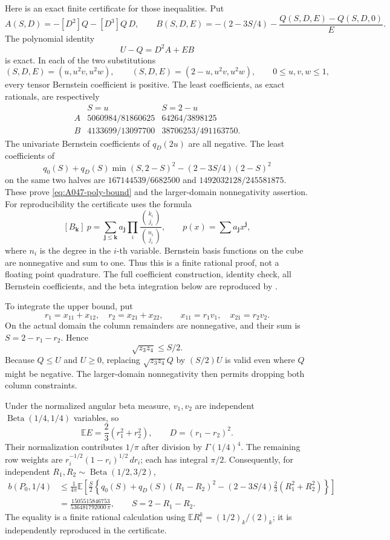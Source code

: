 Here is an exact finite certificate for those inequalities.
Put
\[
 A(S,D)=-[D^2]Q-[D^3]Q\,D,\qquad
 B(S,D,E)=-(2-3S/4)-\frac{Q(S,D,E)-Q(S,D,0)}E .
\]
The polynomial identity
\[
                      U-Q=D^2A+EB
\]
is exact.  In each of the two substitutions
\[
 (S,D,E)=(u,u^2v,u^2w),\qquad
 (S,D,E)=(2-u,u^2v,u^2w),
                   \qquad 0\le u,v,w\le1,
\]
every tensor Bernstein coefficient is positive.  The
least coefficients, as exact rationals, are respectively
\[
 \begin{array}{c|cc}
    & S=u & S=2-u\\ \hline
 A &5060984/81860625&64264/3898125\\
 B &4133699/13097700&38706253/491163750 .
 \end{array}
\]
The univariate Bernstein coefficients of \(q_D(2u)\)
are all negative.  The least coefficients of
\[
 q_0(S)+q_D(S)\min(S,2-S)^2
                              -(2-3S/4)(2-S)^2
\]
on the same two halves are
\(167144539/6682500\) and \(1492032128/245581875\).
These prove \eqref{eq:A047-poly-bound} and the larger-domain
nonnegativity assertion.  For reproducibility the certificate
uses the formula
\[
 [B_{\mathbf k}]\ p
   =\sum_{\mathbf j\le\mathbf k}a_{\mathbf j}
           \prod_i\frac{\binom{k_i}{j_i}}{\binom{n_i}{j_i}},
 \qquad p(x)=\sum a_{\mathbf j}x^{\mathbf j},
\]
where \(n_i\) is the degree in the \(i\)-th variable.
Bernstein basis functions on the cube are nonnegative and
sum to one.  Thus this is a finite rational proof, not a
floating point quadrature.  The full coefficient construction,
identity check, all Bernstein coefficients, and the beta
integration below are reproduced by
.

To integrate the upper bound, put
\[
 r_1=x_{11}+x_{12},\quad r_2=x_{21}+x_{22},\qquad
 x_{11}=r_1v_1,\quad x_{21}=r_2v_2 .
\]
On the actual domain the column remainders are nonnegative,
and their sum is \(S=2-r_1-r_2\).  Hence
\[
 \sqrt{z_3z_4}\le S/2.
\]
Because \(Q\le U\) and \(U\ge0\), replacing
\(\sqrt{z_3z_4}Q\) by \((S/2)U\) is valid even
where \(Q\) might be negative.  The larger-domain
nonnegativity then permits dropping both column constraints.

Under the normalized angular beta measure,
\(v_1,v_2\) are independent
\(\operatorname{Beta}(1/4,1/4)\) variables, so
\[
 \mathbb E E=\frac23(r_1^2+r_2^2),\qquad
 D=(r_1-r_2)^2 .
\]
Their normalization contributes \(1/\pi\) after division
by \(\Gamma(1/4)^4\).
The remaining row weights are
\(r_i^{-1/2}(1-r_i)^{1/2}\,dr_i\); each has
integral \(\pi/2\).
Consequently, for independent
\(R_1,R_2\sim\operatorname{Beta}(1/2,3/2)\),
\begin{align}
 b(P_0,1/4)
 &\le\frac1{4\pi}\mathbb E\left[
 \frac S2\left\{
 q_0(S)+q_D(S)(R_1-R_2)^2
       -(2-3S/4)\frac23(R_1^2+R_2^2)\right\}\right]\nonumber\\
 &=\frac{1505515846753}{536481792000\,\pi},
 \qquad S=2-R_1-R_2 . \label{eq:A047-rational-upper}
\end{align}
The equality is a finite rational calculation using
\(\mathbb E R_i^k=(1/2)_k/(2)_k\); it is independently
reproduced in the certificate.

